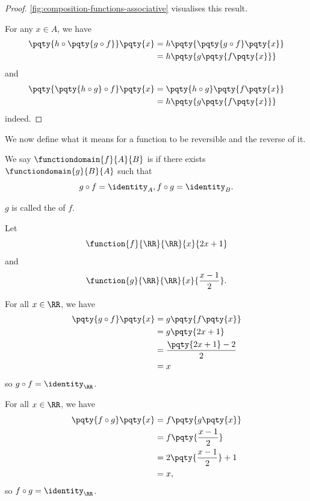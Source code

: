 \begin{proof}
    \autoref{fig:composition-functions-associative} visualises this result.

    For any \(x \in A\), we have
    \begin{align*}
        \pqty{h \circ \pqty{g \circ f}} \pqty{x} &= h\pqty{\pqty{g \circ f} \pqty{x}} \\
        &= h \pqty{g \pqty{f \pqty{x}}}
    \end{align*}
    and
    \begin{align*}
        \pqty{\pqty{h \circ g} \circ f} \pqty{x} &= \pqty{h \circ g} \pqty{f\pqty{x}} \\
        &= h \pqty{g \pqty{f \pqty{x}}}
    \end{align*}
    indeed.
\end{proof}

We now define what it means for a function to be reversible and the reverse of it.

\begin{definition}
    We say \(\functiondomain{f}{A}{B}\) is  if there exists \(\functiondomain{g}{B}{A}\) such that
    \[
        g \circ f = \identity_A, f \circ g = \identity_B.
    \]

    \(g\) is called the  of \(f\).
\end{definition}

\begin{example}
    Let
    \[
        \function{f}{\RR}{\RR}{x}{2x + 1}
    \]
    and
    \[
        \function{g}{\RR}{\RR}{x}{\frac{x - 1}{2}}.
    \]

    For all \(x \in \RR\), we have
    \begin{align*}
        \pqty{g \circ f} \pqty{x} &= g \pqty{f \pqty{x}} \\
        &= g \pqty{2x + 1} \\
        &= \frac{\pqty{2x + 1} - 2}{2} \\
        &= x
    \end{align*}
    so \(g \circ f = \identity_{\RR}\).

    For all \(x \in \RR\), we have
    \begin{align*}
        \pqty{f \circ g} \pqty{x} &= f \pqty{g \pqty{x}} \\
        &= f \pqty{\frac{x - 1}{2}} \\
        &= 2 \pqty{\frac{x - 1}{2}} + 1 \\
        &= x,
    \end{align*}
    so \(f \circ g = \identity_{\RR}\).
\end{example}

